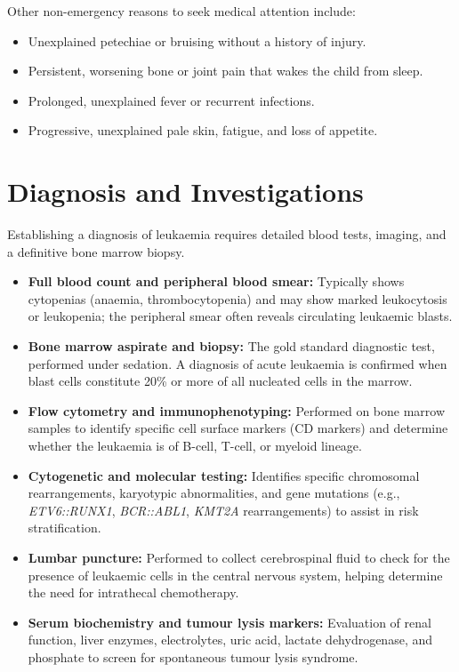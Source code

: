 Other non-emergency reasons to seek medical attention include:
\begin{itemize}
    \item Unexplained petechiae or bruising without a history of injury.
    \item Persistent, worsening bone or joint pain that wakes the child from sleep.
    \item Prolonged, unexplained fever or recurrent infections.
    \item Progressive, unexplained pale skin, fatigue, and loss of appetite.
\end{itemize}

\section*{Diagnosis and Investigations}
Establishing a diagnosis of leukaemia requires detailed blood tests, imaging, and a definitive bone marrow biopsy.
\begin{itemize}
    \item \textbf{Full blood count and peripheral blood smear:} Typically shows cytopenias (anaemia, thrombocytopenia) and may show marked leukocytosis or leukopenia; the peripheral smear often reveals circulating leukaemic blasts.
    \item \textbf{Bone marrow aspirate and biopsy:} The gold standard diagnostic test, performed under sedation. A diagnosis of acute leukaemia is confirmed when blast cells constitute 20\% or more of all nucleated cells in the marrow.
    \item \textbf{Flow cytometry and immunophenotyping:} Performed on bone marrow samples to identify specific cell surface markers (CD markers) and determine whether the leukaemia is of B-cell, T-cell, or myeloid lineage.
    \item \textbf{Cytogenetic and molecular testing:} Identifies specific chromosomal rearrangements, karyotypic abnormalities, and gene mutations (e.g., \textit{ETV6::RUNX1}, \textit{BCR::ABL1}, \textit{KMT2A} rearrangements) to assist in risk stratification.
    \item \textbf{Lumbar puncture:} Performed to collect cerebrospinal fluid to check for the presence of leukaemic cells in the central nervous system, helping determine the need for intrathecal chemotherapy.
    \item \textbf{Serum biochemistry and tumour lysis markers:} Evaluation of renal function, liver enzymes, electrolytes, uric acid, lactate dehydrogenase, and phosphate to screen for spontaneous tumour lysis syndrome.
\end{itemize}


